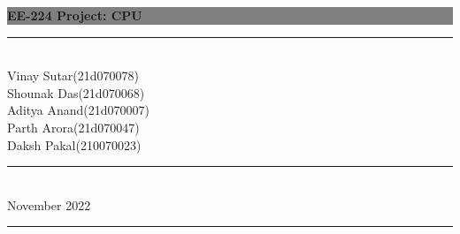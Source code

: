 \documentclass[10pt]{article}
\begin{document}
\begin{titlepage} %
	
	
	\colorbox{grey}{
		\parbox[t]{0.93\textwidth}{ %
			\parbox[t]{0.91\textwidth}{ %
				\raggedleft %
				\fontsize{50pt}{80pt}\selectfont %
				\vspace{0.7cm} %
				
				\textbf{EE-224 Project: CPU}  \hspace{4pt}
				
				\vspace{0.7cm} %
			}
		}
	}
	
	\vfill %
	
	
	\parbox[t]{0.93\textwidth}{ %
		\raggedleft %
		\large %
        \hfill\rule{0.2\linewidth}{1pt} \\
		{\Large Vinay Sutar(21d070078) \\ Shounak Das(21d070068) \\ Aditya Anand(21d070007) \\ Parth Arora(21d070047) \\ Daksh Pakal(210070023)}\\[4pt] %
        \hfill\rule{0.2\linewidth}{1pt} \\
		  November 2022\\[4.8pt] %
		
		\hfill\rule{0.2\linewidth}{1pt}%
	}
	
\end{titlepage}
\newpage
\restoregeometry 

\tableofcontents

\newpage
\Large
\end{document}
